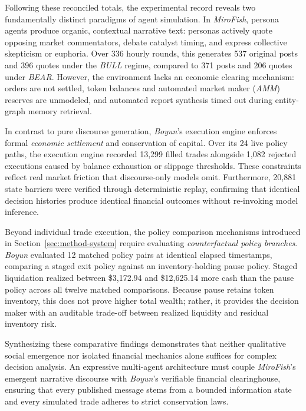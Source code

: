 Following these reconciled totals, the experimental record reveals two
fundamentally distinct paradigms of agent simulation. In \textit{MiroFish},
persona agents produce organic, contextual narrative text: personas actively
quote opposing market commentators, debate catalyst timing, and express
collective skepticism or euphoria. Over 336 hourly rounds, this generates
537 original posts and 396 quotes under the \textit{BULL} regime, compared to
371 posts and 206 quotes under \textit{BEAR}. However, the environment lacks
an economic clearing mechanism: orders are not settled, token balances and
automated market maker (\textit{AMM}) reserves are unmodeled, and automated
report synthesis timed out during entity-graph memory retrieval.

In contrast to pure discourse generation, \textit{Boyun}'s execution engine
enforces formal \textit{economic settlement} and conservation of capital. Over
its 24 live policy paths, the execution engine recorded 13,299 filled trades
alongside 1,082 rejected executions caused by balance exhaustion or slippage
thresholds. These constraints reflect real market friction that discourse-only
models omit. Furthermore, 20,881 state barriers were verified through
deterministic replay, confirming that identical decision histories produce
identical financial outcomes without re-invoking model inference.

Beyond individual trade execution, the policy comparison mechanisms introduced
in Section~\ref{sec:method-system} require evaluating \textit{counterfactual policy branches}.
\textit{Boyun} evaluated 12 matched policy pairs at identical elapsed
timestamps, comparing a staged exit policy against an inventory-holding pause
policy. Staged liquidation realized between \$3,172.94 and \$12,625.14 more
cash than the pause policy across all twelve matched comparisons. Because pause
retains token inventory, this does not prove higher total wealth; rather, it
provides the decision maker with an auditable trade-off between realized
liquidity and residual inventory risk.

Synthesizing these comparative findings demonstrates that neither qualitative
social emergence nor isolated financial mechanics alone suffices for complex
decision analysis. An expressive multi-agent architecture must couple
\textit{MiroFish}'s emergent narrative discourse with \textit{Boyun}'s
verifiable financial clearinghouse, ensuring that every published message stems
from a bounded information state and every simulated trade adheres to strict
conservation laws.
